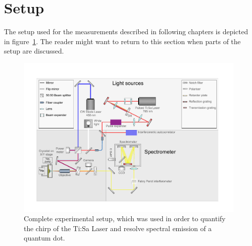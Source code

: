\section{Setup}

The setup used for the measurements described in following chapters is depicted in figure~\ref{fig:setupflat}.
The reader might want to return to this section when parts of the setup are discussed.

\begin{figure}[H]
	\centering
	\includegraphics[width=1.1\linewidth]{figures/setup/Setup_flat}
	\caption{Complete experimental setup, which was used in order to quantify the chirp of the Ti:Sa Laser and resolve spectral emission of a quantum dot.}
	\label{fig:setupflat}
\end{figure}
